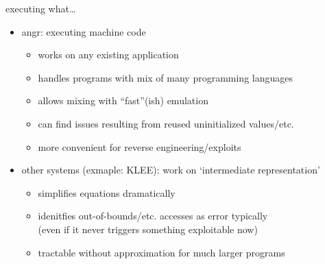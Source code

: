 \begin{frame}{executing what\ldots}
    \begin{itemize}
    \item angr: executing machine code
        \begin{itemize}
        \item works on any existing application
        \item handles programs with mix of many programming languages
        \item allows mixing with ``fast''(ish) emulation
        \item can find issues resulting from reused uninitialized values/etc.
        \item more convenient for reverse engineering/exploits
        \end{itemize}
    \item other systems (exmaple: KLEE): work on `intermediate representation'
        \begin{itemize}
        \item simplifies equations dramatically
        \item idenitfies out-of-bounds/etc. accesses as error typically \\
        (even if it never triggers something exploitable now)
        \item tractable without approximation for much larger programs
        \end{itemize}
    \end{itemize}
\end{frame}

